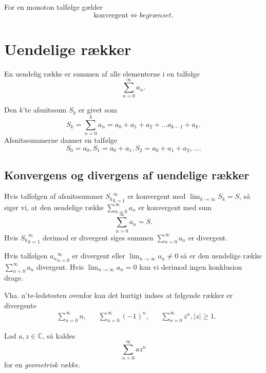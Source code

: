 \begin{sæt}
  For en monoton talfølge gælder
  \[ 
  \text{konvergent} \iff \textit{begrænset}
  .\]
\end{sæt}

\section{Uendelige rækker}
En uendelig række er summen af alle elementerne i en talfølge
\[ 
\sum_{n = 0}^{\infty} a_n
.\]

\begin{definition} 
  Den $k$'te afsnitssum $S_k$ er givet som
  \[ 
  S_k = \sum_{n = 0}^{k} a_n = a_0 + a_1 + a_2 + \ldots a_{k-1} + a_k
  .\]
  Afsnitssummerne danner en talfølge
  \[ 
  S_0 = a_0, S_1 = a_{0}+a_1, S_2 = a_0 + a_1 + a_2, \ldots 
  .\]
\end{definition}

\subsection{Konvergens og divergens af uendelige rækker}
\begin{sæt} 
  Hvis talfølgen af afsnitssummer ${S_k}_{k = 1}^{\infty}$ er konvergent med $\lim_{k \to \infty} S_k = S$, så siger vi, at den uendelige række $\sum_{n = 0}^{\infty} a_n $ er konvergent med sum
  \[ 
  \sum_{n = 0}^{\infty} a_n = S
  .\]
  Hvis ${S_k}_{k = 1}^{\infty}$ derimod er divergent siges summen $\sum_{n = 0}^{\infty} a_n$ er divergent.
\end{sæt}

\begin{sæt} 
  Hvis talfølgen ${a_n}_{n = 0}^{\infty}$ er divergent eller $\lim_{n \to \infty} a_n \neq 0$ så er den uendelige række $\sum_{n = 0}^{\infty} a_n$ divergent. Hvis $\lim_{n \to \infty} a_n = 0$ kan vi derimod ingen konklusion drage.
\end{sæt}
Vha. n'te-ledstesten ovenfor kan det hurtigt indses at følgende rækker er divergente
\begin{align*}
  &\sum_{n = 0}^{\infty} n,& &\sum_{n = 0}^{\infty} (-1)^{n},& &\sum_{n = 0}^{\infty} z^{n}, |z| \geq 1
.\end{align*}

\begin{definition} 
  Lad $a,z \in \mathbb{C}$, så kaldes
  \[ 
  \sum_{n = 0}^{\infty} a z^{n} 
  \]
  for en \textit{geometrisk række}.
\end{definition}

